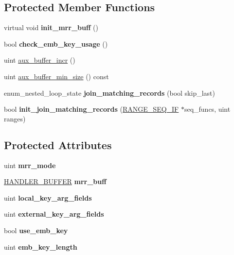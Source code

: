 \subsection*{Protected Member Functions}
\begin{DoxyCompactItemize}
\item 
\mbox{\label{classJOIN__CACHE__BKA_a1d187f689aad667aef6f2bb204d935c7}} 
virtual void {\bfseries init\+\_\+mrr\+\_\+buff} ()
\item 
bool {\bfseries check\+\_\+emb\+\_\+key\+\_\+usage} ()
\item 
uint \mbox{\hyperlink{group__Query__Optimizer_ga8661280e3da40b2c581ec758c50e1979}{aux\+\_\+buffer\+\_\+incr}} ()
\item 
uint \mbox{\hyperlink{group__Query__Optimizer_gaef7343f0416360c14c6134867b347c83}{aux\+\_\+buffer\+\_\+min\+\_\+size}} () const
\item 
enum\+\_\+nested\+\_\+loop\+\_\+state {\bfseries join\+\_\+matching\+\_\+records} (bool skip\+\_\+last)
\item 
bool {\bfseries init\+\_\+join\+\_\+matching\+\_\+records} (\mbox{\hyperlink{structst__range__seq__if}{R\+A\+N\+G\+E\+\_\+\+S\+E\+Q\+\_\+\+IF}} $\ast$seq\+\_\+funcs, uint ranges)
\end{DoxyCompactItemize}
\subsection*{Protected Attributes}
\begin{DoxyCompactItemize}
\item 
\mbox{\label{classJOIN__CACHE__BKA_ab387b9155d72ba199bdc9d95418e974b}} 
uint {\bfseries mrr\+\_\+mode}
\item 
\mbox{\label{classJOIN__CACHE__BKA_a19488a0dcc53d763f0983085b5c1748d}} 
\mbox{\hyperlink{structst__handler__buffer}{H\+A\+N\+D\+L\+E\+R\+\_\+\+B\+U\+F\+F\+ER}} {\bfseries mrr\+\_\+buff}
\item 
\mbox{\label{classJOIN__CACHE__BKA_aa0b778deec52cb7d779336a83731c4a6}} 
uint {\bfseries local\+\_\+key\+\_\+arg\+\_\+fields}
\item 
\mbox{\label{classJOIN__CACHE__BKA_a8092d6c40e77e0969763e55c13244d9c}} 
uint {\bfseries external\+\_\+key\+\_\+arg\+\_\+fields}
\item 
\mbox{\label{classJOIN__CACHE__BKA_a2e64a262d03c7b25c1435eef208c035b}} 
bool {\bfseries use\+\_\+emb\+\_\+key}
\item 
\mbox{\label{classJOIN__CACHE__BKA_ab5e93e7bcf7dd7a4a1333327473c3937}} 
uint {\bfseries emb\+\_\+key\+\_\+length}
\end{DoxyCompactItemize}
